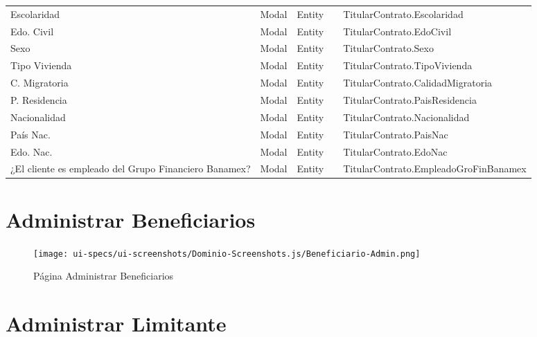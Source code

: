 \begin{table}[H]
{\begin{tabular}{ p{4cm} p{2cm} p{2cm} p{3cm} p{8cm} }
		Escolaridad &
		Modal &
		Entity &
		 &
		TitularContrato.Escolaridad \\
		Edo. Civil &
		Modal &
		Entity &
		 &
		TitularContrato.EdoCivil \\
		Sexo &
		Modal &
		Entity &
		 &
		TitularContrato.Sexo \\
		Tipo Vivienda &
		Modal &
		Entity &
		 &
		TitularContrato.TipoVivienda \\
		C. Migratoria &
		Modal &
		Entity &
		 &
		TitularContrato.CalidadMigratoria \\
		P. Residencia &
		Modal &
		Entity &
		 &
		TitularContrato.PaisResidencia \\
		Nacionalidad &
		Modal &
		Entity &
		 &
		TitularContrato.Nacionalidad \\
		Pa\'is Nac. &
		Modal &
		Entity &
		 &
		TitularContrato.PaisNac \\
		Edo. Nac. &
		Modal &
		Entity &
		 &
		TitularContrato.EdoNac \\
		¿El cliente es empleado del Grupo Financiero Banamex? &
		Modal &
		Entity &
		 &
		TitularContrato.EmpleadoGroFinBanamex \\
		\hline
	\end{tabular}
	}
\end{table}



\section{Administrar Beneficiarios} \label{sec:cf-ui-admin-beneficiario}

\begin{figure}[H]
        \label{tab:ui-search-beneficiario-page}
        \texttt{[image: ui-specs/ui-screenshots/Dominio-Screenshots.js/Beneficiario-Admin.png]}
        \caption{P\'agina Administrar Beneficiarios}
\end{figure}


\section{Administrar Limitante} \label{sec:cf-ui-admin-limitante}

